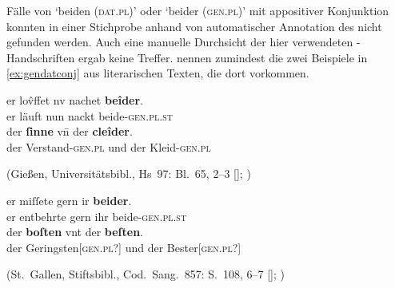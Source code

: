 Fälle von  `beiden (\textsc{dat.pl})' oder 
`beider (\textsc{gen.pl})' mit appositiver Konjunktion konnten in einer
Stichprobe anhand von  automatischer Annotation des
\CAO{} nicht gefunden werden. Auch eine manuelle Durchsicht der hier
verwendeten \KC{}-Handschriften ergab keine Treffer. \citet[626]{ksw2}
nennen zumindest die zwei Beispiele in \cref{ex:gendatconj} aus literarischen
Texten, die dort  vorkommen.

\begin{exe}
\ex \label{ex:gendatconj}
	\begin{xlist}
	\ex \label{ex:gendatconj_1}
		\gll er lov̂ffet nv nachet \textbf{beîder}. \\
			er läuft nun nackt beide-\textsc{gen.pl.st} \\
	\sn	\gll der \textbf{ſinne} vn̄ der \textbf{cleîder}. \\
			der Verstand-\textsc{gen.pl} und der
				Kleid-\textsc{gen.pl} \\
		\begin{taggedline}{(Gießen, Universitätsbibl., Hs~97:
			Bl.~65\vo, 2--3 [\cite[1102]{hsc}];
			\cite[vgl.][500~{[=~V.~3359--3360]}]{mertens2004})} %
		\trans {}
		\end{taggedline}

	\ex \label{ex:gendatconj_2}
		\gll er miſſete gern ir \textbf{beider}. \\
			er entbehrte gern ihr beide-\textsc{gen.pl.st} \\
	\sn	\gll der \textbf{boſten} vnt der \textbf{beſten}. \\
			der Geringsten[\textsc{gen.pl}?] und der
			Bester[\textsc{gen.pl}?] \\
		\begin{taggedline}{(St.~Gallen, Stiftsbibl., Cod.~Sang.~857:
			S.~108, 6--7 [\cite[1211]{hsc}];
			\cite[vgl.][379~{[=~375.6--7]}]{knechtschirok2003})} %
		\trans {}\footnotemark
		\end{taggedline}
	\end{xlist}
\end{exe}
%

